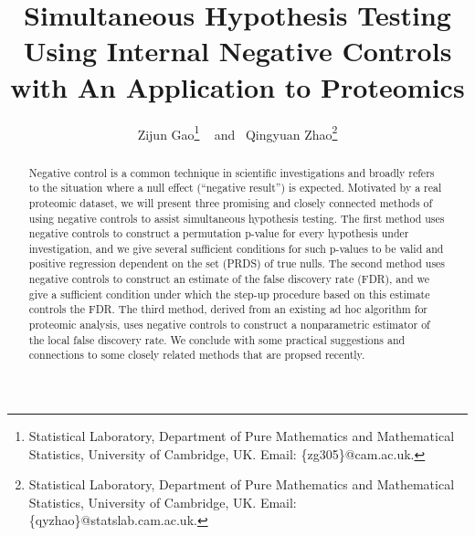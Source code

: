\documentclass[a4paper,11pt]{article}
\title{Simultaneous Hypothesis Testing Using Internal Negative
  Controls with An Application to Proteomics}
\author{Zijun Gao\thanks{Statistical Laboratory, Department of Pure Mathematics and Mathematical Statistics, University of Cambridge, UK. Email: \{zg305\}@cam.ac.uk.} ~ and
  ~Qingyuan Zhao\thanks{Statistical Laboratory, Department of Pure Mathematics and Mathematical Statistics, University of Cambridge, UK. Email: \{qyzhao\}@statslab.cam.ac.uk.}
}
\theoremstyle{plain}
\theoremstyle{definition}
\theoremstyle{plain}
\begin{document}
\maketitle

\begin{abstract}

  Negative control is a common technique in scientific investigations
  and broadly refers to the situation where a null effect (``negative
  result'') is expected. Motivated by a real proteomic dataset, we will
  present three promising and
  closely connected methods of using negative controls to assist
  simultaneous hypothesis testing. The first method uses negative
  controls to construct a permutation p-value for every hypothesis under
  investigation, and we give several sufficient conditions for such
  p-values to be valid and positive regression dependent on the set
  (PRDS) of true nulls. The second method uses negative controls to
  construct an estimate of the false discovery rate (FDR), and we give a
  sufficient condition under which the step-up procedure based on this
  estimate controls the FDR. The third method, derived from an existing
  ad hoc algorithm for proteomic analysis, uses negative controls to
  construct a nonparametric estimator of the local false discovery
  rate. We conclude with some practical suggestions and connections to
  some closely related methods that are propsed recently.
\end{abstract}
\end{document}
